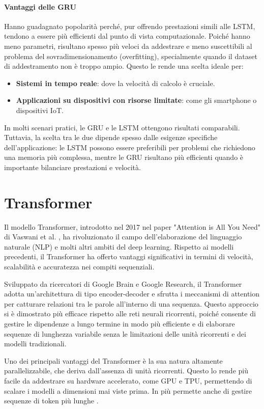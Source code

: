 \paragraph{Vantaggi delle GRU} Hanno guadagnato popolarità perché, pur offrendo prestazioni simili alle LSTM, tendono a essere più efficienti dal punto di vista computazionale. Poiché hanno meno parametri, risultano spesso più veloci da addestrare e meno suscettibili al problema del sovradimensionamento (overfitting), specialmente quando il dataset di addestramento non è troppo ampio. Questo le rende una scelta ideale per:
\begin{itemize}
	\item \textbf{Sistemi in tempo reale}: dove la velocità di calcolo è cruciale.
	\item \textbf{Applicazioni su dispositivi con risorse limitate}: come gli smartphone o dispositivi IoT.
\end{itemize}
In molti scenari pratici, le GRU e le LSTM ottengono risultati comparabili. Tuttavia, la scelta tra le due dipende spesso dalle esigenze specifiche dell'applicazione: le LSTM possono essere preferibili per problemi che richiedono una memoria più complessa, mentre le GRU risultano più efficienti quando è importante bilanciare prestazioni e velocità.

\section{Transformer}
Il modello Transformer, introdotto nel 2017 nel paper "Attention is All You Need" di Vaswani et al. \cite{vaswani2023attentionneed}, ha rivoluzionato il campo dell'elaborazione del linguaggio naturale (NLP) e molti altri ambiti del deep learning. Rispetto ai modelli precedenti, il Transformer ha offerto vantaggi significativi in termini di velocità, scalabilità e accuratezza nei compiti sequenziali.

Sviluppato da ricercatori di Google Brain e Google Research, il Transformer adotta un'architettura di tipo encoder-decoder e sfrutta i meccanismi di attention per catturare relazioni tra le parole all'interno di una sequenza. Questo approccio si è dimostrato più efficace rispetto alle reti neurali ricorrenti, poiché consente di gestire le dipendenze a lungo termine in modo più efficiente e di elaborare sequenze di lunghezza variabile senza le limitazioni delle unità ricorrenti e dei modelli tradizionali.

Uno dei principali vantaggi del Transformer è la sua natura altamente parallelizzabile, che deriva dall'assenza di unità ricorrenti. Questo lo rende più facile da addestrare su hardware accelerato, come GPU e TPU, permettendo di scalare i modelli a dimensioni mai viste prima. In più permette anche di gestire sequenze di token più lunghe \cite{ding2023longnetscalingtransformers1000000000}.


